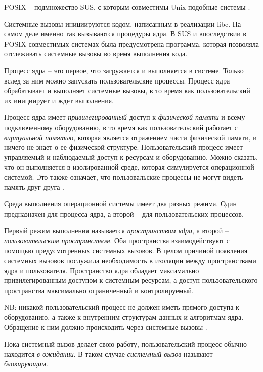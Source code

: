 \documentclass[%
	11pt,
	a4paper,
	utf8,
		]{article}
\begin{document}
POSIX -- подмножество SUS, с которым совместимы Unix-подобные системы \cite[]{amini-extreme-c:2022}.

Системные вызовы инициируются кодом, написанным в реализации libc. На самом деле именно так вызываются процедуры ядра. В SUS и впоследствии в POSIX-совместимых системах была предусмотрена программа, которая позволяла отслеживать системные вызовы во время выполнения кода.

Процесс ядра -- это первое, что загружается и выполняется в системе. Только вслед за ним можно запускать пользовательские процессы. Процесс ядра обрабатывает и выполняет системные вызовы, в то время как пользовательский их инициирует и ждет выполнения. 

Процесс ядра имеет \emph{привилегированный} доступ к \emph{физической памяти} и всему подключенному оборудованию, в то время как пользовательский работает с \emph{виртуальной памятью}, которая является отражением части физической памяти, и ничего не знает о ее физической структуре. Пользовательский процесс имеет управляемый и наблюдаемый доступ к ресурсам и оборудованию. Можно сказать, что он выполняется в изолированной среде, которая симулируется операционной системой. Это также означает, что пользовальские процессы не могут видеть память друг друга \cite[]{amini-extreme-c:2022}.

Среда выполнения операционной системы имеет два разных режима. Один предназначен для процесса ядра, а второй -- для пользовательских процессов.

Первый режим выполнения называется \emph{пространством ядра}, а второй -- \emph{пользовательским пространством}. Оба пространства взаимодействуют с помощью предусмотренных системных вызовов. В целом причиной появления системных вызовов послужила необходимость в изоляции между пространствами ядра и пользователя. Пространство ядра обладает максимально привилегированным доступом к системным ресурсам, а доступ пользовательского пространства максимально ограниченный и контролируемый.

NB: никакой пользовательский процесс не должен иметь прямого доступа к оборудованию, а также к внутренним структурам данных и алгоритмам ядра. Обращение к ним должно происходить через системные вызовы \cite[]{amini-extreme-c:2022}.

Пока системный вызов делает свою работу, пользовательский процесс обычно находится \emph{в ожидании}. В таком случае \emph{системный вызов} называют \emph{блокирующим}.
\end{document}
